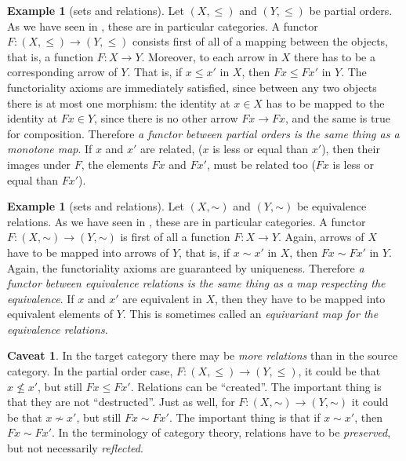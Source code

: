 \documentclass[12pt,oneside]{scrbook}
\def\simord{\mathord\sim}
\numberwithin{equation}{section}
\theoremstyle{plain}
\theoremstyle{definition}
\newtheorem{eg}[thm]{Example}
\newtheorem*{caveat}{Caveat}
\DeclareMathOperator{\1}{\mathbbm{1}}
\DeclareMathOperator{\2}{\mathbbm{2}}
\begin{document}
\begin{eg}[sets and relations]
 Let $(X,\le)$ and $(Y,\le)$ be partial orders. As we have seen in , these are in particular categories. A functor $F:(X,\le)\to (Y,\le)$ consists first of all of a mapping between the objects, that is, a function $F:X\to Y$. Moreover, to each arrow in $X$ there has to be a corresponding arrow of $Y$. That is, if $x\le x'$ in $X$, then $Fx \le Fx'$ in $Y$. The functoriality axioms are immediately satisfied, since between any two objects there is at most one morphism: the identity at $x\in X$ has to be mapped to the identity at $Fx\in Y$, since there is no other arrow $Fx\to Fx$, and the same is true for composition. 
 Therefore \emph{a functor between partial orders is the same thing as a monotone map}. If $x$ and $x'$ are related, ($x$ is less or equal than $x'$), then their images under $F$, the elements $Fx$ and $Fx'$, must be related too ($Fx$ is less or equal than $Fx'$). 
\end{eg}

\begin{eg}[sets and relations]\label{equequ}
 Let $(X,\simord)$ and $(Y,\simord)$ be equivalence relations. As we have seen in , these are in particular categories. A functor $F:(X,\simord)\to(Y,\simord)$ is first of all a function $F:X\to Y$. Again, arrows of $X$ have to be mapped into arrows of $Y$, that is, if $x\sim x'$ in $X$, then $Fx \sim Fx'$ in $Y$. Again, the functoriality axioms are guaranteed by uniqueness.
 Therefore \emph{a functor between equivalence relations is the same thing as a map respecting the equivalence}.
 If $x$ and $x'$ are equivalent in $X$, then they have to be mapped into equivalent elements of $Y$. This is sometimes called an \emph{equivariant map for the equivalence relations}. 
\end{eg}

\begin{caveat}
 In the target category there may be \emph{more relations} than in the source category. In the partial order case, $F:(X,\le)\to (Y,\le)$, it could be that $x\nleq x'$, but still $Fx \leq Fx'$. Relations can be ``created''. The important thing is that they are not ``destructed''.
 Just as well, for $F:(X,\simord)\to(Y,\simord)$ it could be that $x\nsim x'$, but still $Fx \sim Fx'$. The important thing is that if $x\sim x'$, then $Fx \sim Fx'$.
 In the terminology of category theory, relations have to be \emph{preserved}, but not necessarily \emph{reflected}. 
\end{caveat}
\end{document}

